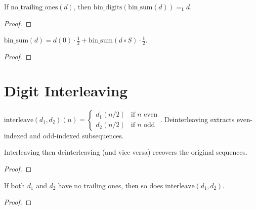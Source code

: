 \begin{lemma}\label{lem:bin_digits_bin_sum}
  \rocqok
  If $\mathrm{no\_trailing\_ones}(d)$, then
  $\mathrm{bin\_digits}(\mathrm{bin\_sum}(d)) =_1 d$.
\end{lemma}
\begin{proof}\rocqok\end{proof}

\begin{lemma}\label{lem:bin_sum_shift}
  \rocqok
  $\mathrm{bin\_sum}(d) = d(0) \cdot \tfrac{1}{2} + \mathrm{bin\_sum}(d \circ S) \cdot \tfrac{1}{2}$.
\end{lemma}
\begin{proof}\rocqok\end{proof}


\section{Digit Interleaving}\label{sec:interleaving}

\begin{definition}\label{def:interleave}
  \rocqok
  $\mathrm{interleave}(d_1, d_2)(n) =
  \begin{cases} d_1(n/2) & \text{if } n \text{ even} \\
  d_2(n/2) & \text{if } n \text{ odd} \end{cases}$.
  Deinterleaving extracts even-indexed and odd-indexed subsequences.
\end{definition}

\begin{lemma}\label{lem:interleave_roundtrip}
  \rocqok
  Interleaving then deinterleaving (and vice versa) recovers the
  original sequences.
\end{lemma}
\begin{proof}\rocqok\end{proof}

\begin{lemma}\label{lem:interleave_no_trailing_ones}
  \rocqok
  If both $d_1$ and $d_2$ have no trailing ones, then so does
  $\mathrm{interleave}(d_1, d_2)$.
\end{lemma}
\begin{proof}\rocqok\end{proof}



